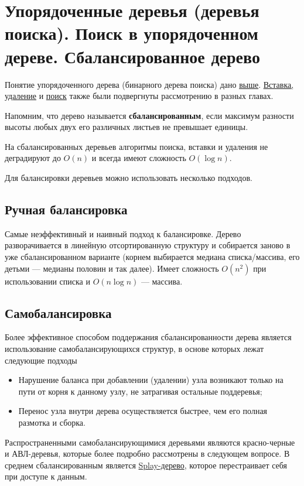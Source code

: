 \section{Упорядоченные деревья (деревья поиска). Поиск в упорядоченном дереве.  Сбалансированное дерево}
Понятие упорядоченного дерева (бинарного дерева поиска) дано \hyperref[def:bst]{выше}.
\hyperref[sec:tree-ins-del]{Вставка, удаление} и \hyperref[alg:bst-search]{поиск} также были
подвергнуты рассмотрению в разных главах.

Напомним, что дерево называется \textbf{сбалансированным}, если максимум разности высоты любых двух его различных
листьев не превышает единицы.

На сбалансированных деревьев алгоритмы поиска, вставки и удаления не деградируют до $O(n)$
и всегда имеют сложность $O(\log n)$.

Для балансировки деревьев можно использовать несколько подходов.
\subsection{Ручная балансировка}
Самые неэффективный и наивный подход к балансировке. Дерево разворачивается
в линейную отсортированную структуру и собирается заново в уже сбалансированном варианте
(корнем выбирается медиана списка/массива, его детьми --- медианы половин и так далее).
Имеет сложность $O(n^2)$ при использовании списка и $O(n\log n)$ --- массива.

\subsection{Самобалансировка}
Более эффективное способом поддержания сбалансированности дерева является использование
самобалансирующихся структур, в основе которых лежат следующие подходы
\begin{itemize}
  \item Нарушение баланса при добавлении (удалении) узла возникают только на пути от корня к данному узлу,
  не затрагивая остальные поддеревья;
  \item Перенос узла внутри дерева осуществляется быстрее, чем его полная размотка и сборка.
\end{itemize}

Распространенными самобалансирующимися деревьями являются красно-черные и АВЛ-деревья,
которые более подробно рассмотрены в следующем вопросе. В среднем сбалансированным
является \href{https://en.wikipedia.org/wiki/Splay_tree}{Splay-дерево}, которое перестраивает
себя при доступе к данным.

